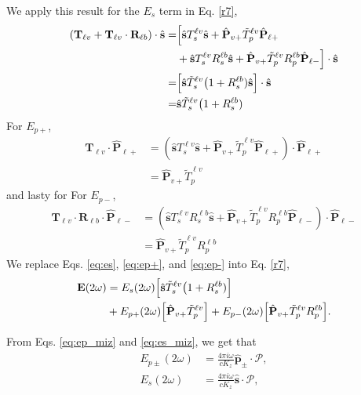 \documentclass{article}
\begin{document}
We apply this result for the $E_{s}$ term in Eq. \eqref{r7},
\begin{align}\label{eq:es}
\left(\mathbf{T}_{\ell v} + \mathbf{T}_{\ell v}\cdot\mathbf{R}_{\ell b}\right)\cdot\hat{\mathbf{s}} = &\Bigl[\hat{\mathbf{s}}T_{s}^{\ell v}\hat{\mathbf{s}} + \hat{\mathbf{P}}_{v+}\tilde{T}_{p}^{\ell v} \hat{\mathbf{P}}_{\ell +}\nonumber\\
&+ \hat{\mathbf{s}}T_{s}^{\ell v}R_{s}^{\ell b}\hat{\mathbf{s}} + \hat{\mathbf{P}}_{v+}\tilde{T}_{p}^{\ell v}R_{p}^{\ell b}\hat{\mathbf{P}}_{\ell -} \Bigr]\cdot\hat{\mathbf{s}}\nonumber\\
= &\Bigl[\hat{\mathbf{s}}\tilde{T}_{s}^{\ell v}\bigl(1 + R_{s}^{\ell b})\hat{\mathbf{s}}\Bigr]\cdot\hat{\mathbf{s}}\nonumber\\
= &\hat{\mathbf{s}}\tilde{T}_{s}^{\ell v}\bigl(1 + R_{s}^{\ell b})
\end{align}
For $E_{p+}$,
\begin{align}\label{eq:ep+}
\mathbf{T}_{\ell v}\cdot\hat{\mathbf{P}}_{\ell +} &= (\hat{\mathbf{s}}T_{s}^{\ell v}\hat{\mathbf{s}} + \hat{\mathbf{P}}_{v+}\tilde{T}_{p}^{\ell v} \hat{\mathbf{P}}_{\ell +})\cdot\hat{\mathbf{P}}_{\ell +}\nonumber\\
&= \hat{\mathbf{P}}_{v+}\tilde{T}_{p}^{\ell v}
\end{align}
and lasty for For $E_{p-}$,
\begin{align}\label{eq:ep-}
\mathbf{T}_{\ell v}\cdot\mathbf{R}_{\ell b}\cdot\hat{\mathbf{P}}_{\ell -} &= (\hat{\mathbf{s}}T_{s}^{\ell v}R_{s}^{\ell b}\hat{\mathbf{s}} + \hat{\mathbf{P}}_{v+}\tilde{T}_{p}^{\ell v}R_{p}^{\ell b}\hat{\mathbf{P}}_{\ell -})\cdot\hat{\mathbf{P}}_{\ell -}\nonumber\\
&= \hat{\mathbf{P}}_{v+}\tilde{T}_{p}^{\ell v}R_{p}^{\ell b}
\end{align}
We replace Eqs. \eqref{eq:es}, \eqref{eq:ep+}, and \eqref{eq:ep-} into Eq. \eqref{r7},
\begin{align}\label{eq:e2w}
\mathbf{E}(2\omega) &=
E_{s}(2\omega)\Bigl[\hat{\mathbf{s}}\tilde{T}_{s}^{\ell v}\bigl(1 + R_{s}^{\ell b})\Bigr]\nonumber\\ 
&+ E_{p+}(2\omega)\Bigl[\hat{\mathbf{P}}_{v+}\tilde{T}_{p}^{\ell v}\Bigr] + E_{p-}(2\omega)\Bigl[\hat{\mathbf{P}}_{v+}\tilde{T}_{p}^{\ell v}R_{p}^{\ell b}\Bigr].
\end{align}

From Eqs. \eqref{eq:ep_miz} and \eqref{eq:es_miz}, we get that 
\begin{align}
E_{p\pm}(2\omega) &= \frac{4\pi i\omega}{c K_{z}}\hat{\mathbf{p}}_{\pm}\cdot\boldsymbol{\mathcal{P}},\label{eq:ep_miz2w}\\
E_{s}(2\omega) & = \frac{4\pi i\omega}{c K_{z}}\hat{\mathbf{s}}\cdot\boldsymbol{\mathcal{P}}\label{eq:es_miz2w},
\end{align}
\end{document}
